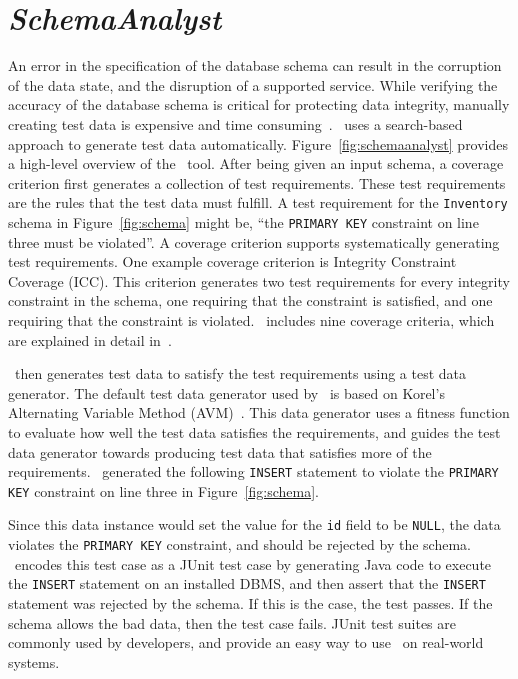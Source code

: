 \section{\textit{SchemaAnalyst}}\label{sec:technique}

An error in the specification of the database schema can result in the corruption of the data state, and the disruption
of a supported service.  While verifying the accuracy of the database schema is critical for protecting data integrity,
manually creating test data is expensive and time consuming~\cite{kapfhammer2013search}. \sa~uses a
search-based approach to generate test data automatically. Figure~\ref{fig:schemaanalyst} provides a high-level overview
of the \sa~tool.  After being given an input schema, a coverage criterion first generates a
collection of test requirements. These test requirements are the rules that the test data must fulfill. A test
requirement for the \texttt{Inventory} schema in Figure~\ref{fig:schema} might be, ``the \texttt{PRIMARY KEY} constraint
on line three must be violated''. A coverage criterion supports systematically generating test requirements. One example
coverage criterion is Integrity Constraint Coverage (ICC). This criterion generates two test requirements for every
integrity constraint in the schema, one requiring that the constraint is satisfied, and one requiring that the
constraint is violated. \sa~includes nine coverage criteria, which are explained in detail
in~\cite{mcminn2015effectiveness}.

\sa~then generates test data to satisfy the test requirements using a test data generator. The
default test data generator used by \sa~is based on Korel's Alternating Variable Method
(AVM)~\cite{Korel:AVM}.  This data generator uses a fitness function to evaluate how well the test data satisfies the
requirements, and guides the test data generator towards producing test data that satisfies more of the requirements.
\sa~generated the following \texttt{INSERT} statement to violate the \texttt{PRIMARY KEY} constraint
on line three in Figure~\ref{fig:schema}.



Since this data instance would set the value for the \texttt{id} field to be \texttt{NULL}, the data violates the
\texttt{PRIMARY KEY} constraint, and should be rejected by the schema.  \sa~encodes this test case as a JUnit test case
by generating Java code to execute the \texttt{INSERT} statement on an installed DBMS, and then assert that the
\texttt{INSERT} statement was rejected by the schema. If this is the case, the test passes.  If the schema allows the
bad data, then the test case fails. JUnit test suites are commonly used by developers, and provide an easy way to use
\sa~on real-world systems.

